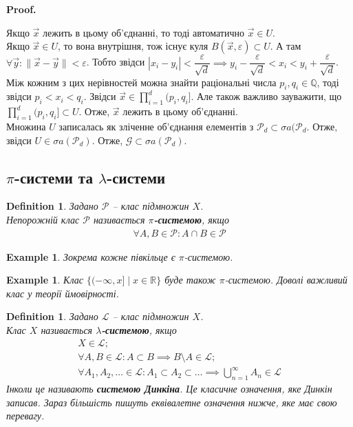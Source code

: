 \documentclass[a4paper, 10pt]{article}
\makeatletter
\theoremstyle{theoremdd}
\newtheorem{definition}[theorem]{Definition}
\newtheorem{example}[theorem]{Example}
\renewenvironment{proof}[1][Proof.\\]{\par
\pushQED{\hfill \qed}%
\normalfont \topsep6\p@\@plus6\p@\relax
\trivlist
\item\relax
{\bfseries
#1\@addpunct{.}}\hspace\labelsep\ignorespaces
}{%
\popQED\endtrivlist\@endpefalse
}
\makeatother
\begin{document}
\begin{proof}
Якщо $\vec{x}$ лежить в цьому об'єднанні, то тоді автоматично $\vec{x} \in U$.\\
Якщо $\vec{x} \in U$, то вона внутрішня, тож існує куля $B(\vec{x},\varepsilon) \subset U$. А там $\forall \vec{y}: \| \vec{x} - \vec{y} \| < \varepsilon$. Тобто звідси $|x_i-y_i| < \dfrac{\varepsilon}{\sqrt{d}} \implies y_i - \dfrac{\varepsilon}{\sqrt{d}} < x_i < y_i + \dfrac{\varepsilon}{\sqrt{d}}$. Між кожним з цих нерівностей можна знайти раціональні числа $p_i,q_i \in \mathbb{Q}$, тоді звідси $p_i < x_i < q_i$. Звідси $\vec{x} \in \displaystyle\prod_{i=1}^d (p_i,q_i]$. Але також важливо зауважити, що $\displaystyle\prod_{i=1}^d (p_i,q_i] \subset U$. Отже, $\vec{x}$ лежить в цьому об'єднанні.\\
Множина $U$ записалась як зліченне об'єднання елементів з $\mathcal{P}_d \subset \sigma a(\mathcal{P}_d$. Отже, звідси $U \in \sigma a(\mathcal{P}_d)$. Отже, $\mathcal{G} \subset \sigma a(\mathcal{P}_d)$.
\end{proof}

\subsection{$\pi$-системи та $\lambda$-системи}
\begin{definition}
Задано $\mathcal{P}$ -- клас підмножин $X$.\\
Непорожній клас $\mathcal{P}$ називається \textbf{$\pi$-системою}, якщо
\begin{align*}
\forall A,B \in \mathcal{P}: A \cap B \in \mathcal{P}
\end{align*}
\end{definition}

\begin{example}
Зокрема кожне півкільце є $\pi$-системою.
\end{example}

\begin{example}
Клас $\{(-\infty,x] \mid x \in \mathbb{R}\}$ буде також $\pi$-системою. Доволі важливий клас у теорії ймовірності.
\end{example}

\begin{definition}
Задано $\mathcal{L}$ -- клас підмножин $X$.\\
Клас $X$ називається \textbf{$\lambda$-системою}, якщо
\begin{align*}
X \in \mathcal{L}; \\
\forall A,B \in \mathcal{L}: A \subset B \implies B \setminus A \in \mathcal{L}; \\
\forall A_1,A_2,\dots \in \mathcal{L}: A_1 \subset A_2 \subset \dots \implies \bigcup_{n=1}^\infty A_n \in \mathcal{L}
\end{align*}
Інколи це називають \textbf{системою Динкіна}. Це класичне означення, яке Динкін записав. Зараз більшість пишуть еквівалетне означення нижче, яке має свою перевагу.
\end{definition}
\end{document}
